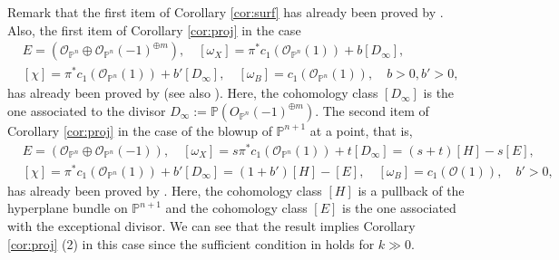 \documentclass{amsart}
\numberwithin{equation}{section}
\theoremstyle{plain}
\theoremstyle{definition}
\theoremstyle{remark}
\begin{document}
Remark that the first item of Corollary \ref{cor:surf} has already been proved by \cite[equation (14)]{SD}. Also, the first item of Corollary \ref{cor:proj} in the case 
\begin{equation}
    \begin{aligned}
        &E=(\mathcal{O}_{\mathbb{P}^n}\oplus \mathcal{O}_{\mathbb{P}^n}(-1)^{\oplus m}), \quad [\omega_X]=\pi^*c_1(\mathcal{O}_{\mathbb{P}^n}(1))+b[D_\infty],\\ 
        &[\chi]=\pi^*c_1(\mathcal{O}_{\mathbb{P}^n}(1))+b'[D_\infty], \quad[\omega_B]=c_1(\mathcal{O}_{\mathbb{P}^n}(1)), \quad b>0,b'>0,
    \end{aligned}
\end{equation} 
has already been proved by \cite[Theorem 1.7]{FL} (see also \cite{DMS}). Here, the cohomology class $[D_\infty]$ is the one associated to the divisor $D_\infty:=\mathbb{P}(O_{\mathbb{P}^n}(-1)^{\oplus m})$.
The second item of Corollary \ref{cor:proj} in the case of the blowup of $\mathbb{P}^{n+1}$ at a point, that is,
\begin{equation}
    \begin{aligned}
        &E=(\mathcal{O}_{\mathbb{P}^n}\oplus \mathcal{O}_{\mathbb{P}^n}(-1)), \quad [\omega_X]=
        s\pi^*c_1(\mathcal{O}_{\mathbb{P}^n}(1))+t[D_\infty]=(s+t)[H]-s[E],\\ 
        &[\chi]=\pi^*c_1(\mathcal{O}_{\mathbb{P}^n}(1))+b'[D_\infty]=(1+b')[H]-[E],\quad [\omega_B]=c_1(\mathcal{O}(1)), \quad b'>0,
    \end{aligned}
\end{equation} 
has already been proved by \cite{JS}. Here, the cohomology class $[H]$ is a pullback of the hyperplane bundle on $\mathbb{P}^{n+1}$ and the cohomology class $[E]$ is the one associated with the exceptional divisor.  We can see that the result \cite{JS} implies Corollary \ref{cor:proj} (2) in this case since the sufficient condition in \cite[Lemma 1]{JS} holds for $k\gg0$.
\end{document}
